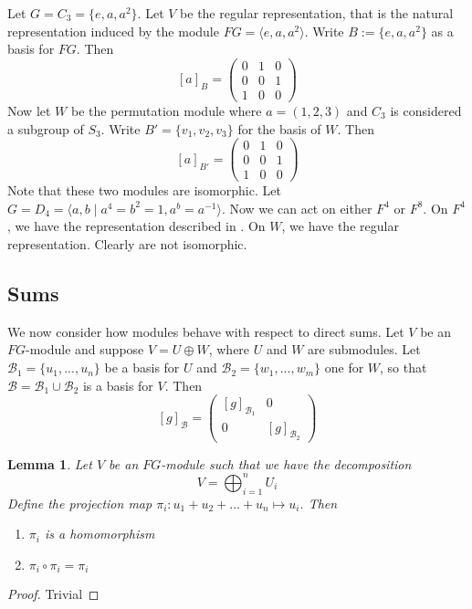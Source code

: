 \documentclass[11pt, notitlepage]{article}
\numberwithin{equation}{section}
\theoremstyle{plain}
\newtheorem{lemma}[theorem]{Lemma}
\theoremstyle{definition}
\newenvironment{example}
	{\pushQED{\qed}\renewcommand{\qedsymbol}{$\blacktriangleleft$}\examplex}
	{\popQED\endexamplex}
\newcommand{\mcl}{\mathcal}
\begin{document}
\begin{example}
	Let $G = C_3 = \{e, a, a^2\}$. Let $V$ be the regular representation, that is the natural representation induced by the module $FG = \langle e, a, a^2 \rangle$. Write $B:= \{e, a, a^2\}$ as a basis for $FG$. Then
\[
	[a]_B = \left(\begin{matrix}
	0 & 1 & 0 \\ 0 & 0 & 1 \\ 1 & 0 & 0
	\end{matrix}\right)
\]
Now let $W$ be the permutation module where $a = (1, 2, 3)$ and $C_3$ is considered a subgroup of $S_3$. Write $B' = \{v_1, v_2, v_3\}$ for the basis of $W$. Then
\[
	[a]_{B'} = \left(\begin{matrix}
	0 & 1 & 0 \\ 0 & 0 & 1 \\ 1 & 0 & 0
	\end{matrix}\right)
\]
	Note that these two modules are isomorphic. 
\end{example}
\begin{example}
	Let $G = D_4 = \langle a, b \mid a^4 = b^2 = 1, a^b = a^{-1}\rangle$. Now we can act on either $F^4$ or $F^8$. On $F^4$, we have the representation described in . On $W$, we have the regular representation. Clearly are not isomorphic.
\end{example}

\subsection{Sums}

We now consider how modules behave with respect to direct sums. Let $V$ be an $FG$-module and suppose $V = U \oplus W$, where $U$ and $W$ are submodules. Let $\mcl{B}_1 =\{u_1,...,u_n\}$ be a basis for $U$ and $\mcl{B}_2 =\{w_1,...,w_m\}$ one for $W$, so that $\mcl{B} = \mcl{B}_1 \cup \mcl{B_2}$ is a basis for $V$. Then 
\[
    [g]_{\mcl{B}} = \begin{pmatrix*}
        [g]_{\mcl B_1} & 0 \\0 & [g]_{\mcl{B}_2}
    \end{pmatrix*}
\]

\begin{lemma}
	Let $V$ be an $FG$-module such that we have the decomposition
\[
	V = \bigoplus_{i = 1}^n U_i
\]
Define the projection map $\pi_i: u_1 + u_2 +...+ u_n \mapsto u_i$. Then 
	\begin{enumerate}[label=\emph{(\Roman*)}]
		\item $\pi_i$ is a homomorphism
		\item $\pi_i \circ \pi_i = \pi_i$
	\end{enumerate}
\end{lemma}
\begin{proof}
	Trivial
\end{proof}
\end{document}
